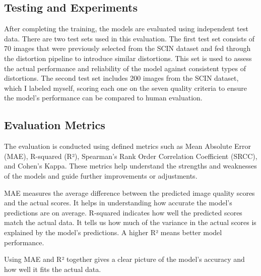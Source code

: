 \subsection{Testing and Experiments}
\label{sub:TestExperiment}
After completing the training, the models are evaluated using independent test data. There are two test sets used in this evaluation. The first test set consists of 70 images that were previously selected from the SCIN dataset and fed through the distortion pipeline to introduce similar distortions. This set is used to assess the actual performance and reliability of the model against consistent types of distortions. The second test set includes 200 images from the SCIN dataset, which I labeled myself, scoring each one on the seven quality criteria to ensure the model’s performance can be compared to human evaluation. \par 

\subsection{Evaluation Metrics}
\label{sub:EvaluationMetrics}
The evaluation is conducted using defined metrics such as Mean Absolute Error (MAE), R-squared (R²), Spearman’s Rank Order Correlation Coefficient (SRCC), and Cohen’s Kappa. These metrics help understand the strengths and weaknesses of the models and guide further improvements or adjustments. \par
\vspace{\baselineskip}
\noindent
MAE measures the average difference between the predicted image quality scores and the actual scores. It helps in understanding how accurate the model’s predictions are on average. R-squared indicates how well the predicted scores match the actual data. It tells us how much of the variance in the actual scores is explained by the model’s predictions. A higher R² means better model performance. \par
\vspace{\baselineskip}
\noindent
Using MAE and R² together gives a clear picture of the model’s accuracy and how well it fits the actual data.
